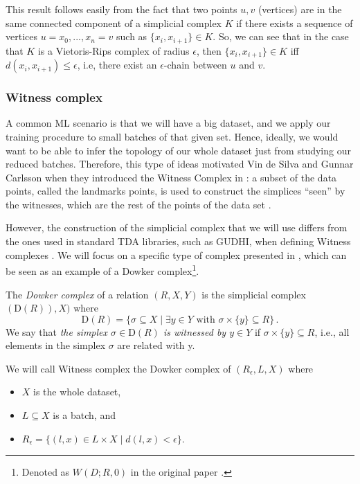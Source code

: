 \documentclass[../main.tex]{subfiles}
\begin{document}
This result follows easily from the fact that two points $u,v$ (vertices) are in the same connected component of a simplicial complex $K$ if there exists a sequence of vertices $u=x_0,..., x_n=v$ such as $\{x_i, x_{i+1}\} \in K$. So, we can see that in the case that $K$ is a Vietoris-Rips complex of radius $\epsilon$, then $\{x_i, x_{i+1}\} \in K$ iff $d(x_i, x_{i+1})\leq\epsilon$, i.e, there exist an $\epsilon$-chain between $u$ and $v$. 

\subsubsection*{Witness complex}

A common ML scenario is that we will have a big dataset, and we apply our training procedure to small batches of that given set. Hence, ideally, we would want to be able to infer the topology of our whole dataset just from studying our reduced batches. Therefore, this type of ideas motivated Vin de Silva and Gunnar Carlsson when they introduced the Witness Complex in \cite{silva_topological_2004}: a subset of the data points, called the landmarks points, is used to construct the simplices ``seen'' by the witnesses, which are the rest of the points of the data set \cite{medbouhi_towards_2022}.

However, the construction of the simplicial complex that we will use differs from the ones used in standard TDA libraries, such as GUDHI, when defining Witness complexes \cite{noauthor_gudhi_nodate}. We will focus on a specific type of complex presented in \cite{silva_topological_2004}, which can be seen as an example of a Dowker complex\footnote{Denoted as $W(D; R, 0)$ in the original paper \cite{silva_topological_2004}.}.

\begin{definition}
The \emph{Dowker complex} of a relation $(R, X, Y)$ is the simplicial complex $(\text{D}(R)), X)$ where
\[
\text{D}(R) = \{\sigma \subseteq X \mid \exists y \in Y \text{ with } \sigma \times \{y\} \subseteq R\}\,.
\]
We say that \emph{the simplex $\sigma \in \text{D}(R)$ is witnessed by $y \in Y$} if $\sigma \times \{y\} \subseteq R$, i.e., all elements in the simplex $\sigma$ are related with y.
\end{definition}

We will call Witness complex the Dowker complex of $(R_\epsilon, L, X)$ where
\begin{itemize}
    \item $X$ is the whole dataset,
    \item $L\subseteq X$ is a batch, and
    \item $R_\epsilon=\{(l,x)\in L \times X \mid d(l,x)<\epsilon\}$. 
\end{itemize}
\end{document}
